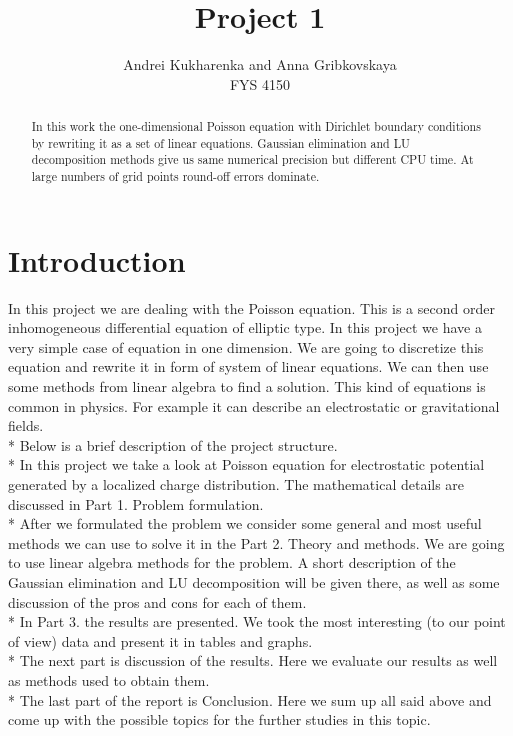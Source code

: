 \documentclass[10pt]{article}
\begin{document}
\setlength\parindent{1pt}
\title{Project 1}
\author{Andrei Kukharenka and Anna Gribkovskaya \\  
FYS 4150 
}

\maketitle
\begin{abstract}
In this work the one-dimensional Poisson equation with Dirichlet boundary conditions by rewriting it as a set of linear equations.
Gaussian elimination and LU decomposition methods give us same numerical precision but different CPU time. At large numbers of grid points round-off errors dominate. 
\end{abstract}
\clearpage 


\section{Introduction}
In this project we are dealing with the Poisson equation. This is a second order inhomogeneous differential equation of elliptic type. In this project we have a very simple case of equation in one dimension. We are going to discretize this equation and rewrite it in form of system of linear equations. We can then use some methods from linear algebra to find a solution. This kind of equations is common in physics. For example it can describe an electrostatic or gravitational fields.  \\* 
Below is a brief description of the project structure. \\* 
In this project we take a look at Poisson equation for electrostatic potential generated by a localized charge distribution. The mathematical details are discussed in Part 1. Problem formulation.\\* 
After we formulated the problem we consider some general and most useful methods we can use to solve it in the Part 2. Theory and methods. We are going to use linear algebra methods for the problem. A short description of the Gaussian elimination and LU decomposition will be given there, as well as some discussion of the pros and cons for each of them.\\* 
In Part 3. the results are presented. We took the most interesting (to our point of view) data and present it in tables and graphs. \\* 
The next part is discussion of the results. Here we evaluate our results as well as methods used to obtain them. \\* 
The last part of the report is Conclusion. Here we sum up all said above and come up with the possible topics for the further studies  in this topic. 
\end{document}
